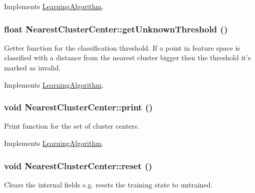 Implements \hyperlink{classLearningAlgorithm}{LearningAlgorithm}.\hypertarget{classNearestClusterCenter_aad9b89686794d4b974b38e3aac7bb51e}{
\subsubsection[{getUnknownThreshold}]{\setlength{\rightskip}{0pt plus 5cm}float NearestClusterCenter::getUnknownThreshold ()}}
\label{classNearestClusterCenter_aad9b89686794d4b974b38e3aac7bb51e}
Getter function for the classification threshold. If a point in feature space is classified with a distance from the nearest cluster bigger then the threshold it's marked as invalid. 

Implements \hyperlink{classLearningAlgorithm}{LearningAlgorithm}.\hypertarget{classNearestClusterCenter_a9ae11b14356f29dcf5fa2666dac6faed}{
\subsubsection[{print}]{\setlength{\rightskip}{0pt plus 5cm}void NearestClusterCenter::print ()}}
\label{classNearestClusterCenter_a9ae11b14356f29dcf5fa2666dac6faed}
Print function for the set of cluster centers. 

Implements \hyperlink{classLearningAlgorithm}{LearningAlgorithm}.\hypertarget{classNearestClusterCenter_ab5f85125ff65850ca4673fa0e85a0af5}{
\subsubsection[{reset}]{\setlength{\rightskip}{0pt plus 5cm}void NearestClusterCenter::reset ()}}
\label{classNearestClusterCenter_ab5f85125ff65850ca4673fa0e85a0af5}
Clears the internal fields e.g. resets the training state to untrained. 

